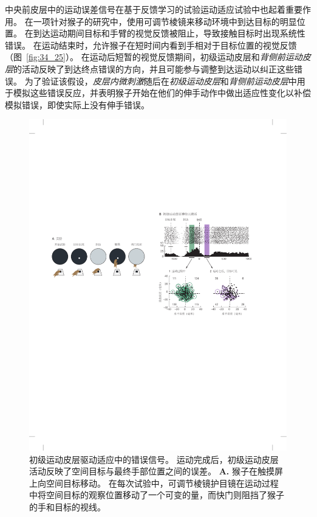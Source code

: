 中央前皮层中的运动误差信号在基于反馈学习的试验运动适应试验中也起着重要作用。
在一项针对猴子的研究中，使用可调节棱镜来移动环境中到达目标的明显位置。
在到达运动期间目标和手臂的视觉反馈被阻止，导致接触目标时出现系统性错误。
在运动结束时，允许猴子在短时间内看到手相对于目标位置的视觉反馈（图~\ref{fig:34_25}）。
在运动后短暂的视觉反馈期间，初级运动皮层和\textit{背侧前运动皮层}的活动反映了到达终点错误的方向，并且可能参与调整到达运动以纠正这些错误。
为了验证该假设，\textit{皮层内微刺激}随后在\textit{初级运动皮层}和\textit{背侧前运动皮层}中用于模拟这些错误反应，并表明猴子开始在他们的伸手动作中做出适应性变化以补偿模拟错误，即使实际上没有伸手错误。


\begin{figure}[htbp]
	\centering
	\includegraphics[width=1.0\linewidth]{chap34/fig_34_25}
	\caption{初级运动皮层驱动适应中的错误信号。
		运动完成后，初级运动皮层活动反映了空间目标与最终手部位置之间的误差\cite{inoue2016error}。
		\textbf{A.} 猴子在触摸屏上向空间目标移动。
		在每次试验中，可调节棱镜护目镜在运动过程中将空间目标的观察位置移动了一个可变的量，而快门则阻挡了猴子的手和目标的视线。
}
\end{figure}
